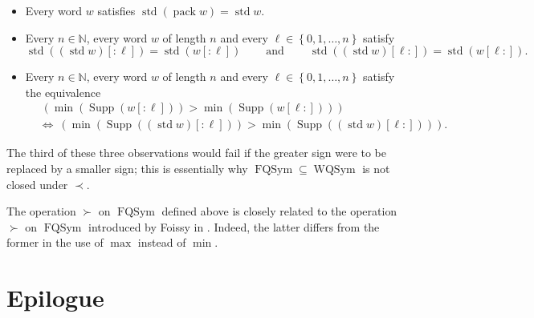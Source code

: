 \documentclass
[numbers=enddot,12pt,final,onecolumn,notitlepage,abstracton]{scrartcl}%
\theoremstyle{definition}
\begin{document}
\begin{itemize}
\item Every word $w$ satisfies $\operatorname*{std}\left(
\operatorname*{pack}w\right)  =\operatorname*{std}w$.

\item Every $n\in\mathbb{N}$, every word $w$ of length $n$ and every $\ell
\in\left\{  0,1,\ldots,n\right\}  $ satisfy
\[
\operatorname*{std}\left(  \left(  \operatorname*{std}w\right)  \left[
:\ell\right]  \right)  =\operatorname*{std}\left(  w\left[  :\ell\right]
\right)  \ \ \ \ \ \ \ \ \ \ \text{and}\ \ \ \ \ \ \ \ \ \ \operatorname*{std}%
\left(  \left(  \operatorname*{std}w\right)  \left[  \ell:\right]  \right)
=\operatorname*{std}\left(  w\left[  \ell:\right]  \right)  .
\]


\item Every $n\in\mathbb{N}$, every word $w$ of length $n$ and every $\ell
\in\left\{  0,1,\ldots,n\right\}  $ satisfy the equivalence%
\begin{align*}
&  \ \left(  \min\left(  \operatorname*{Supp}\left(  w\left[  :\ell\right]
\right)  \right)  >\min\left(  \operatorname*{Supp}\left(  w\left[
\ell:\right]  \right)  \right)  \right) \\
&  \Longleftrightarrow\ \left(  \min\left(  \operatorname*{Supp}\left(
\left(  \operatorname*{std}w\right)  \left[  :\ell\right]  \right)  \right)
>\min\left(  \operatorname*{Supp}\left(  \left(  \operatorname*{std}w\right)
\left[  \ell:\right]  \right)  \right)  \right)  .
\end{align*}

\end{itemize}

The third of these three observations would fail if the greater sign were to
be replaced by a smaller sign; this is essentially why $\operatorname*{FQSym}%
\subseteq\operatorname*{WQSym}$ is not closed under $\left.  \prec\right.  $.

The operation $\left.  \succ\right.  $ on $\operatorname*{FQSym}$ defined
above is closely related to the operation $\left.  \succ\right.  $ on
$\operatorname*{FQSym}$ introduced by Foissy in \cite[Section 4.2]{Foissy07}.
Indeed, the latter differs from the former in the use of $\max$ instead of
$\min$.

\section{\label{sect.epilogue}Epilogue}
\end{document}
